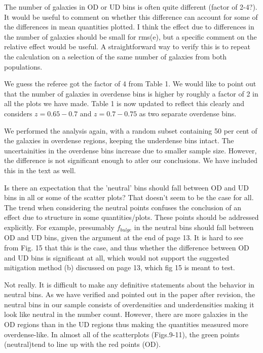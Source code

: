 \documentclass[english]{letter}
\begin{document}
\begin{shaded}
The number of galaxies in OD or UD bins is often quite different (factor of 2-4?). It would be useful to comment on whether this difference can account for some of the differences in mean quantities plotted. I think the effect due to differences in the number of galaxies should be small for rms(e), but a specific comment on the relative effect would be useful. A straightforward way to verify this is to repeat the calculation on a selection of the same number of galaxies from both populations.
\end{shaded}
\noindent 
We guess the referee got the factor of 4 from Table 1. We would like to point out that the number of galaxies in overdense bins is higher by roughly a factor of 2 in all the plots we have made. Table 1 is now updated to reflect this clearly and considers $z=0.65-0.7$ and $z=0.7-0.75$ as two separate overdense bins. 

We performed the analysis again, with a random subset containing 50 per cent of the galaxies in overdense regions, keeping the underdense bins intact. The uncertainities in the overdense bins increase due to smaller sample size. However, the difference is not significant enough to atler our conclusions. We have included this in the text as well.

\begin{shaded}
Is there an expectation that the 'neutral' bins should fall between OD and UD bins in all or some of the scatter plots? That doesn't seem to be the case for all. The trend when considering the neutral points confuses the conclusion of an effect due to structure in some quantities/plots. These points should be addressed explicitly. For example, presumably $f_{bulge}$ in the neutral bins should fall between OD and UD bins, given the argument at the end of page 13. It is hard to see from Fig. 15 that this is the case, and thus whether the difference between OD and UD bins is significant at all, which would not support the suggested mitigation method (b) discussed on page 13, which fig 15 is meant to test.
\end{shaded}

Not really. It is difficult to make any definitive statements about the behavior in neutral bins. As we have verified and pointed out in the paper after revision,
the neutral bins in our sample consists of overdensities and underdensities making it look like neutral in the number count. However, there are more galaxies in the OD regions than in the UD regions thus making the quantities measured more overdense-like. In almost all of the scatterplots (Figs.9-11), the green points (neutral)tend to line up with the red points (OD). 
\end{document}
